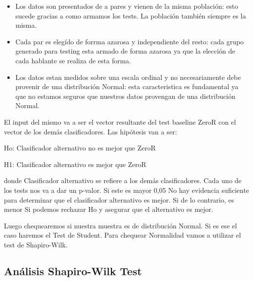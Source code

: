 \documentclass[11pt,a4paper,twoside]{tesis}
\begin{document}
\begin{itemize}
    \item Los datos son presentados de a pares y vienen de la misma población: esto sucede gracias a como armamos los tests. La población también siempre es la misma.
    \item Cada par es elegído de forrma azarosa y independiente del resto: cada grupo generado para testing esta armado de forma azarosa ya que la elección de cada hablante se realiza de esta forma.
    \item Los datos estan medidos sobre una escala ordinal y no necesariamente debe provenir de una distribución Normal: esta caracteristica es fundamental ya que no estamos seguros que nuestros datos provengan de una distribución Normal.
\end{itemize}

El input del mismo va a ser el vector resultante del test baseline ZeroR con el vector de los demás clasificadores. Las hipótesis van a ser:

\vspace{0.5cm}
\hspace{2cm}Ho: Clasificador alternativo no es mejor que ZeroR
\vspace{0.25cm}

\hspace{2cm}H1: Clasificador alternativo es mejor que ZeroR
\vspace{0.5cm}

donde Clasificador alternativo se refiere a los demás clasificadores. 
Cada uno de los tests nos va a dar un p-valor.
Si este es mayor 0,05 No hay evidencia suficiente para determinar que el clasificador alternativo es mejor.
Si de lo contrario, es menor Si podemos rechazar Ho y asegurar que el alternativo es mejor. 

Luego chequearemos si nuestra muestra es de distribución Normal. Si es ese el caso haremos el Test de Student. Para chequear Normalidad vamos a utilizar el test de Shapiro-Wilk.

\subsection{Análisis Shapiro-Wilk Test}

\end{document}
